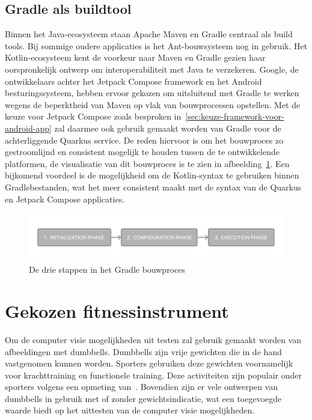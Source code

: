 \subsection{Gradle als buildtool}
\label{subsec:gradle}
Binnen het Java-ecosysteem staan Apache Maven en Gradle centraal als build tools.
Bij sommige oudere applicaties is het Ant-bouwsysteem nog in gebruik.
Het Kotlin-ecosysteem kent de voorkeur naar Maven en Gradle gezien haar oorspronkelijk ontwerp om interoperabiliteit met Java te verzekeren.
Google, de ontwikkelaars achter het Jetpack Compose framework en het Android besturingssysteem, hebben ervoor gekozen om uitsluitend met Gradle te werken wegens de beperktheid van Maven op vlak van bouwprocessen opstellen.
Met de keuze voor Jetpack Compose zoals besproken in~\ref{sec:keuze-framework-voor-android-app} zal daarmee ook gebruik gemaakt worden van Gradle voor de achterliggende Quarkus service.
De reden hiervoor is om het bouwproces zo gestroomlijnd en consistent mogelijk te houden tussen de te ontwikkelende platformen, de visualisatie van dit bouwproces is te zien in afbeelding~\ref{fig:visualisatie-gradle-bouwproces}.
Een bijkomend voordeel is de mogelijkheid om de Kotlin-syntax te gebruiken binnen Gradlebestanden, wat het meer consistent maakt met de syntax van de Quarkus en Jetpack Compose applicaties.
\begin{figure}[H]
    \includegraphics[width=1\linewidth]{images/gradle-buildprocess}
    \caption{De drie stappen in het Gradle bouwproces~\autocite{Gradle}}
    \label{fig:visualisatie-gradle-bouwproces}
\end{figure}

\section{Gekozen fitnessinstrument}
\label{sec:gekozen-fitnessinstrument}
Om de computer visie mogelijkheden uit testen zal gebruik gemaakt worden van afbeeldingen met dumbbells.
Dumbbells zijn vrije gewichten die in de hand vastgenomen kunnen worden.
Sporters gebruiken deze gewichten voornamelijk voor krachttraining en functionele training.
Deze activiteiten zijn populair onder sporters volgens een opmeting van~\textcite{Thompson2022}.
Bovendien zijn er vele ontwerpen van dumbbells in gebruik met of zonder gewichtsindicatie, wat een toegevoegde waarde biedt op het uittesten van de computer visie mogelijkheden.